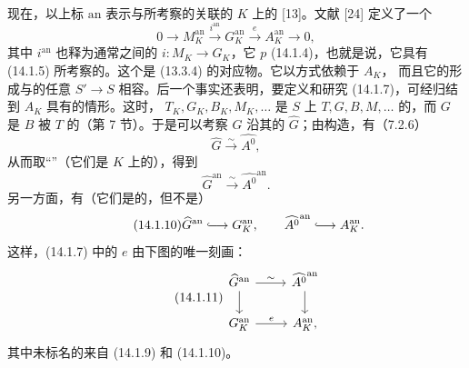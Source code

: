 现在，以上标 $\mathrm{an}$ 表示与所考察的关联的 $K$ 上的 [13]。文献 [24] 定义了一个
\begin{equation}\tag{14.1.7}
0\longrightarrow M_K^{\mathrm{an}}\xrightarrow{i^{\mathrm{an}}}
G_K^{\mathrm{an}}\xrightarrow e A_K^{\mathrm{an}}\longrightarrow0,
\end{equation}
其中 $i^{\mathrm{an}}$ 也释为通常之间的 $i:M_K\to G_K$，它 $p$ (14.1.4)，也就是说，它具有 (14.1.5) 所考察的。这个是 (13.3.4) 的对应物。它以方式依赖于 $A_K$，
而且它的形成与的任意 $S'\to S$ 相容。后一个事实还表明，要定义和研究 (14.1.7)，可经归结到 $A_K$ 具有的情形。这时， $T_K,G_K,B_K,M_K,\ldots$ 是 $S$ 上 $T,G,B,M,\ldots$ 的，而 $G$ 是 $B$ 被 $T$ 的（第 7 节）。于是可以考察 $G$ 沿其的 $\widehat G$；由构造，有（7.2.6）
\begin{equation}\tag{14.1.8}
\widehat G\xrightarrow\sim\widehat{A^0},
\end{equation}
从而取“”（它们是 $K$ 上的），得到
\begin{equation}\tag{14.1.9}
\widehat G^{\mathrm{an}}\xrightarrow\sim\widehat{A^0}^{\mathrm{an}}.
\end{equation}
另一方面，有（它们是的，但不是）
\begin{equation}\tag{14.1.10}
\widehat G^{\mathrm{an}}\lhook\joinrel\longrightarrow G_K^{\mathrm{an}},
\qquad \widehat{A^0}^{\mathrm{an}}\lhook\joinrel\longrightarrow A_K^{\mathrm{an}}.
\end{equation}
这样，(14.1.7) 中的 $e$ 由下图的唯一刻画：
\begin{equation}\tag{14.1.11}
\begin{tikzcd}
\widehat G^{\mathrm{an}}\arrow[r,"\sim"]\arrow[d]&\widehat{A^0}^{\mathrm{an}}\arrow[d]\\
G_K^{\mathrm{an}}\arrow[r,"e"]&A_K^{\mathrm{an}},
\end{tikzcd}
\end{equation}
其中未标名的来自 (14.1.9) 和 (14.1.10)。

